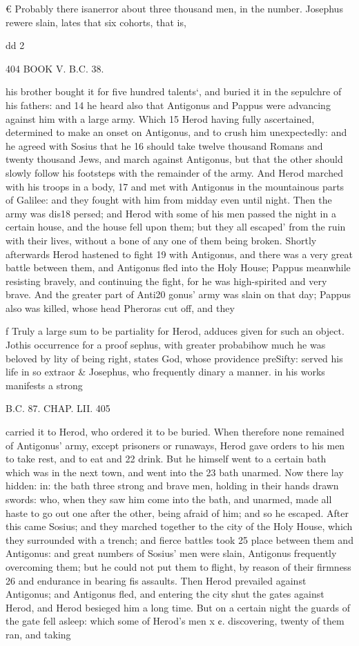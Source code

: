 € Probably there isanerror about three thousand men, in the number. Josephus rewere slain, lates that six cohorts, that is, 

dd 2 

404 BOOK V. B.C. 38. 

his brother bought it for five hundred talents‘, and buried it in the sepulchre of his fathers: and 14 he heard also that Antigonus and Pappus were advancing against him with a large army. Which 15 Herod having fully ascertained, determined to make an onset on Antigonus, and to crush him unexpectedly: and he agreed with Sosius that he 16 should take twelve thousand Romans and twenty thousand Jews, and march against Antigonus, but that the other should slowly follow his footsteps with the remainder of the army. 
And Herod marched with his troops in a body, 17 and met with Antigonus in the mountainous parts of Galilee: and they fought with him from midday even until night. Then the army was dis18 persed; and Herod with some of his men passed the night in a certain house, and the house fell upon them; but they all escaped’ from the ruin with their lives, without a bone of any one of them being broken. 
Shortly afterwards Herod hastened to fight 19 with Antigonus, and there was a very great battle between them, and Antigonus fled into the Holy House; Pappus meanwhile resisting bravely, and continuing the fight, for he was high-spirited and very brave. And the greater part of Anti20 gonus’ army was slain on that day; Pappus also was killed, whose head Pheroras cut off, and they 

f Truly a large sum to be partiality for Herod, adduces given for such an object. Jothis occurrence for a proof sephus, with greater probabihow much he was beloved by lity of being right, states God, whose providence preSifty: served his life in so extraor
& Josephus, who frequently dinary a manner. in his works manifests a strong 

B.C. 87. CHAP. LII. 405 

carried it to Herod, who ordered it to be buried. 
When therefore none remained of Antigonus’ army, except prisoners or runaways, Herod gave orders to his men to take rest, and to eat and 22 drink. But he himself went to a certain bath 
which was in the next town, and went into the 23 bath unarmed. Now there lay hidden: in: the bath three strong and brave men, holding in their hands drawn swords: who, when they saw him come into the bath, and unarmed, made all haste to go out one after the other, being afraid of him; and so he escaped. 
After this came Sosius; and they marched together to the city of the Holy House, which they surrounded with a trench; and fierce battles took 25 place between them and Antigonus: and great 
numbers of Sosius’ men were slain, Antigonus 
frequently overcoming them; but he could not 
put them to flight, by reason of their firmness 26 and endurance in bearing fis assaults. Then Herod prevailed against Antigonus; and Antigonus fled, and entering the city shut the gates against Herod, and Herod besieged him a long time. 
But on a certain night the guards of the gate fell asleep: which some of Herod’s men x ¢. discovering, twenty of them ran, and taking %

